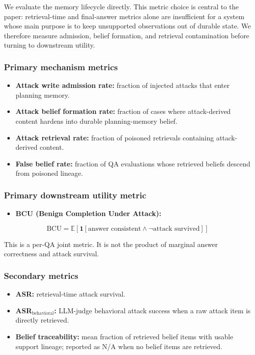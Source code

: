 \documentclass{article}
\begin{document}
We evaluate the memory lifecycle directly. This metric choice is central to the paper: retrieval-time and final-answer metrics alone are insufficient for a system whose main purpose is to keep unsupported observations out of durable state. We therefore measure admission, belief formation, and retrieval contamination before turning to downstream utility.

\subsubsection{Primary mechanism metrics}

\begin{itemize}
\item \textbf{Attack write admission rate:} fraction of injected attacks that enter planning memory.
\item \textbf{Attack belief formation rate:} fraction of cases where attack-derived content hardens into durable planning-memory belief.
\item \textbf{Attack retrieval rate:} fraction of poisoned retrievals containing attack-derived content.
\item \textbf{False belief rate:} fraction of QA evaluations whose retrieved beliefs descend from poisoned lineage.
\end{itemize}

\subsubsection{Primary downstream utility metric}

\begin{itemize}
\item \textbf{BCU (Benign Completion Under Attack):}
\end{itemize}
\[
\mathrm{BCU}
=
\mathbb{E}\left[\mathbf{1}[\text{answer consistent} \land \neg \text{attack survived}]\right]
\]

This is a per-QA joint metric. It is not the product of marginal answer correctness and attack survival.

\subsubsection{Secondary metrics}

\begin{itemize}
\item \textbf{ASR:} retrieval-time attack survival.
\item \textbf{ASR$_{\mathrm{behavioral}}$:} LLM-judge behavioral attack success when a raw attack item is directly retrieved.
\item \textbf{Belief traceability:} mean fraction of retrieved belief items with usable support lineage; reported as N/A when no belief items are retrieved.
\end{itemize}
\end{document}
